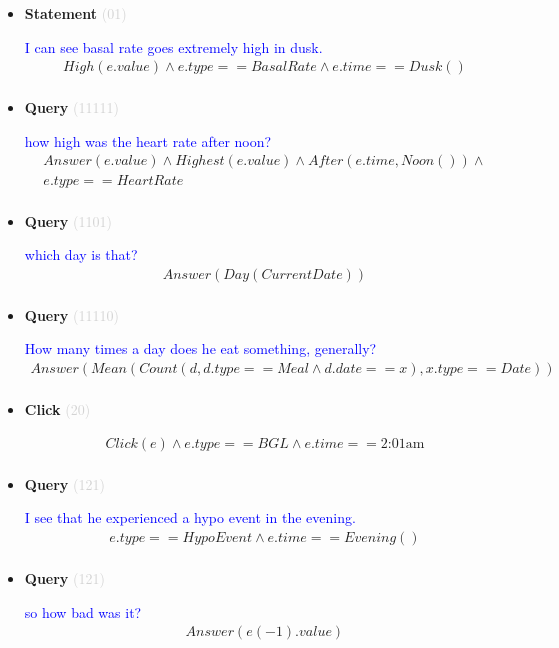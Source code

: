 \documentclass[11pt]{article}
\newcommand{\key}[1]{\textcolor{lightgray}{#1}}
\newcounter{CQuery}
\newcounter{CStatement}
\newcounter{CClick}
\begin{document}
\begin{itemize}
\item
\textbf{Statement\theCStatement} \key{(01)} \addtocounter{CStatement}{1}
\textcolor{blue}{ I can see basal rate goes extremely high in dusk. }
\begin{multline*}
High(e.value) \wedge e.type==BasalRate \wedge e.time==Dusk() \\ 
\end{multline*}


\item
\textbf{Query\theCQuery} \key{(11111)} \addtocounter{CQuery}{1}
\textcolor{blue}{ how high was the heart rate after noon? }
\begin{multline*}
Answer(e.value) \wedge Highest(e.value) \wedge After(e.time, Noon()) \wedge \\ 
e.type==HeartRate \\ 
\end{multline*}


\item
\textbf{Query\theCQuery} \key{(1101)} \addtocounter{CQuery}{1}
\textcolor{blue}{ which day is that? }
\begin{multline*}
Answer(Day(CurrentDate)) \\ 
\end{multline*}


\item
\textbf{Query\theCQuery} \key{(11110)} \addtocounter{CQuery}{1}
\textcolor{blue}{ How many times a day does he eat something, generally? }
\begin{multline*}
Answer(Mean(Count(d, d.type==Meal \wedge d.date==x), x.type==Date)) \\ 
\end{multline*}


\item
\textbf{Click\theCClick} \key{(20)} \addtocounter{CClick}{1}
\textcolor{blue}{  }
\begin{multline*}
Click(e) \wedge e.type==BGL \wedge e.time==\mbox{2:01am} \\ 
\end{multline*}


\item
\textbf{Query\theCQuery} \key{(121)} \addtocounter{CQuery}{1}
\textcolor{blue}{ I see that he experienced a hypo event in the evening. }
\begin{multline*}
e.type==HypoEvent \wedge e.time==Evening() \\ 
\end{multline*}


\item
\textbf{Query\theCQuery} \key{(121)} \addtocounter{CQuery}{1}
\textcolor{blue}{ so how bad was it? }
\begin{multline*}
Answer(e(-1).value) \\ 
\end{multline*}



\end{itemize}
\end{document}
